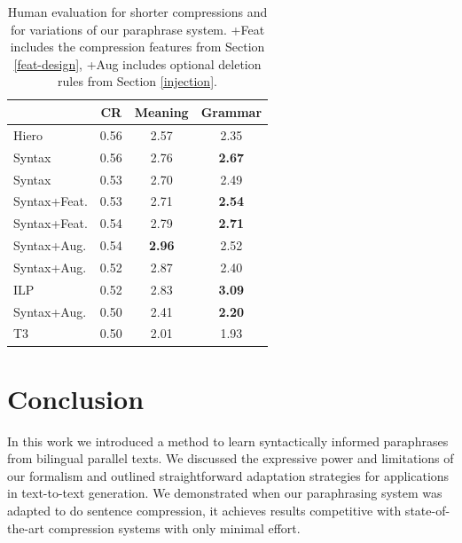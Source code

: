 \documentclass[11pt]{article}
\begin{document}
 \begin{table}
   \small
   \begin{center}
     \begin{tabular}{|l|c|c|c|}
       \hline
       & CR & Meaning & Grammar \\
       \hline
       Hiero & 0.56 & 2.57 & 2.35 \\
       Syntax & 0.56 & 2.76 & {\bf 2.67} \\
       \hline
       \hline
       Syntax & 0.53 & 2.70 & 2.49 \\
       Syntax+Feat.& 0.53 & 2.71 & {\bf 2.54} \\
       \hline
       \hline
       Syntax+Feat. & 0.54 & 2.79 & {\bf 2.71} \\
       Syntax+Aug. & 0.54 & {\bf 2.96} & 2.52 \\
       \hline
       \hline
       Syntax+Aug. & 0.52 & 2.87 & 2.40 \\
       ILP & 0.52 & 2.83 & {\bf 3.09} \\
       \hline
       \hline
       Syntax+Aug. & 0.50 & 2.41 & {\bf 2.20} \\
       T3 & 0.50 & 2.01 & 1.93 \\
       \hline
    \end{tabular}
   \end{center}
   \normalsize
   \caption{Human evaluation for shorter compressions and for variations of our paraphrase system.  +Feat includes the compression features from Section \ref{feat-design}, +Aug includes optional deletion rules from Section \ref{injection}. \vspace{-.5cm} }
   \label{comparison}
 \end{table}

\vspace{-.125cm}
\section{Conclusion} \label{conclusion}
\vspace{-.125cm}

In this work we introduced a method to learn syntactically informed
paraphrases from bilingual parallel texts. We discussed the expressive
power and limitations of our formalism and outlined straightforward
adaptation strategies for applications in text-to-text generation. We
demonstrated when our paraphrasing system was adapted to do sentence
compression, it achieves results competitive with state-of-the-art
compression systems with only minimal effort.
\end{document}
